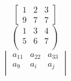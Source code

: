 \documentclass[a4paper,10pt]{article}
\begin{document}
\begin{equation}
\begin{bmatrix}
1 & 2 & 3 \\
9& 7 & 7
\end{bmatrix}
\end{equation}
\begin{equation}
\begin{pmatrix}
1 & 3 & 4 \\
5 & 6 & 7 \\
\end{pmatrix}
\end{equation}
\begin{equation}
\begin{vmatrix}
a_{11} & a_{22} & a_{33} \\
a_9 & a_i & a_j \\
\end{vmatrix}
\end{equation}
\end{document}
